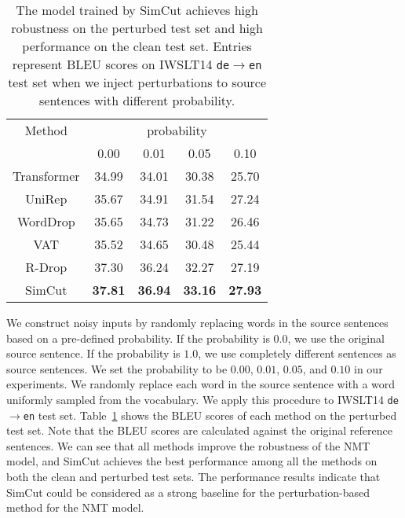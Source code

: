 \documentclass[11pt]{article}
\begin{document}
\begin{table}
\centering
\begin{tabular}{c|c|c|c|c}
\hline
Method & \multicolumn{4}{|c}{probability} \\
 & 0.00 & 0.01 & 0.05 & 0.10 \\ \hline\hline
Transformer & 34.99 & 34.01 & 30.38 & 25.70 \\ UniRep & 35.67 & 34.91 & 31.54 & 27.24 \\ WordDrop & 35.65 & 34.73 & 31.22 & 26.46 \\ VAT & 35.52 & 34.65 & 30.48 & 25.44 \\ R-Drop & 37.30 & 36.24 & 32.27 & 27.19 \\ \hline
SimCut & \bf 37.81 & \bf 36.94 & \bf 33.16 & \bf 27.93 \\
\end{tabular}
\caption{\label{noisy}
The model trained by SimCut achieves high robustness on the perturbed test set and high performance on the clean test set. Entries represent BLEU scores on IWSLT14 \texttt{de}$\rightarrow$\texttt{en} test set when we inject perturbations to source sentences with different probability.
}
\end{table}

We construct noisy inputs by randomly replacing words in the source sentences based on a pre-defined probability. If the probability is $0.0$, we use the original source sentence. If the probability is $1.0$, we use completely different sentences as source sentences. We set the probability to be $0.00$, $0.01$, $0.05$, and $0.10$ in our experiments. We randomly replace each word in the source sentence with a word uniformly sampled from the vocabulary. We apply this procedure to IWSLT14 \texttt{de}$\rightarrow$\texttt{en} test set. Table~\ref{noisy} shows the BLEU scores of each method on the perturbed test set. Note that the BLEU scores are calculated against the original reference sentences. We can see that all methods improve the robustness of the NMT model, and SimCut achieves the best performance among all the methods on both the clean and perturbed test sets.  The performance results indicate that SimCut could be considered as a strong baseline for the perturbation-based method for the NMT model.
\end{document}
